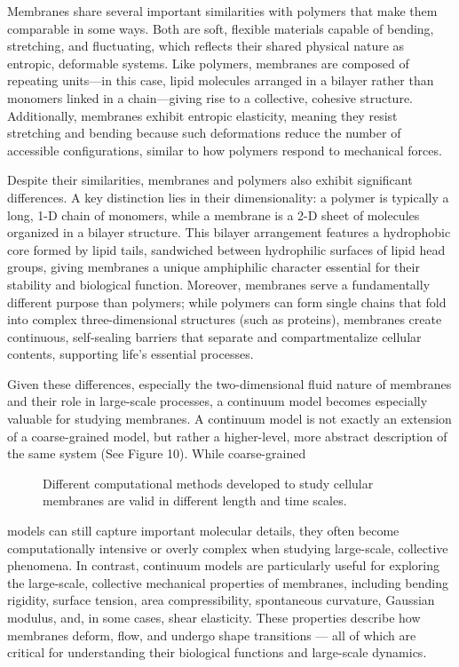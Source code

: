\documentclass[12pt]{article}
\begin{document}
\begin{flushleft}
Membranes share several important similarities with polymers that make them comparable in some ways. Both are soft, flexible materials capable of bending, stretching, and fluctuating, which reflects their shared physical nature as entropic, deformable systems. Like polymers, membranes are composed of repeating units—in this case, lipid molecules arranged in a bilayer rather than monomers linked in a chain—giving rise to a collective, cohesive structure. Additionally, membranes exhibit entropic elasticity, meaning they resist stretching and bending because such deformations reduce the number of accessible configurations, similar to how polymers respond to mechanical forces.


Despite their similarities, membranes and polymers also exhibit significant differences. A key distinction lies in their dimensionality: a polymer is typically a long, 1-D chain of monomers, while a membrane is a 2-D sheet of molecules organized in a bilayer structure. This bilayer arrangement features a hydrophobic core formed by lipid tails, sandwiched between hydrophilic surfaces of lipid head groups, giving membranes a unique amphiphilic character essential for their stability and biological function. Moreover, membranes serve a fundamentally different purpose than polymers; while polymers can form single chains that fold into complex three-dimensional structures (such as proteins), membranes create continuous, self-sealing barriers that separate and compartmentalize cellular contents, supporting life’s essential processes.


Given these differences, especially the two-dimensional fluid nature of membranes and their role in large-scale processes, a continuum model becomes especially valuable for studying membranes. A continuum model is not exactly an extension of a coarse-grained model, but rather a higher-level, more abstract description of the same system (See Figure 10). While coarse-grained

\begin{figure}[!ht]
  \centering
  \caption{Different computational methods developed to study cellular membranes are valid in different length and time scales.\cite{chabanon2017systems}}
\end{figure}



\noindent models can still capture important molecular details, they often become computationally intensive or overly complex when studying large-scale, collective phenomena. In contrast, continuum models are particularly useful for exploring the large-scale, collective mechanical properties of membranes, including bending rigidity, surface tension, area compressibility, spontaneous curvature, Gaussian modulus, and, in some cases, shear elasticity. These properties describe how membranes deform, flow, and undergo shape transitions — all of which are critical for understanding their biological functions and large-scale dynamics.



\end{flushleft}
\end{document}
